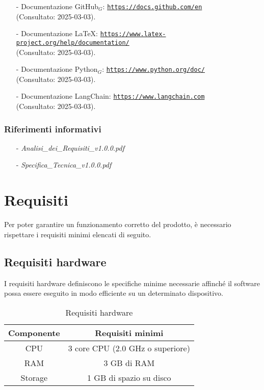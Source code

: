 \documentclass[10pt]{article}
\begin{document}
\begin{justify}
\begin{itemize}
    \item[-] Documentazione GitHub$_G$: \textcolor{blue}{\texttt{\url{https://docs.github.com/en}}} \\
    (Consultato: 2025-03-03).
    
    \item[-] Documentazione \LaTeX: \textcolor{blue}{\texttt{\url{https://www.latex-project.org/help/documentation/}}} \\
    (Consultato: 2025-03-03).
    
    \item[-] Documentazione Python$_G$: \textcolor{blue}{\texttt{\url{https://www.python.org/doc/}}} \\
    (Consultato: 2025-03-03).
    
    \item[-] Documentazione LangChain: \textcolor{blue}{\texttt{\url{https://www.langchain.com}}} \\
    (Consultato: 2025-03-03).
\end{itemize}

\subsubsection{Riferimenti informativi}
\begin{itemize}
    \item[-] \textit{Analisi\_dei\_Requisiti\_v1.0.0.pdf}
    \item[-] \textit{Specifica\_Tecnica\_v1.0.0.pdf}
\end{itemize}

\newpage

\section{Requisiti}
\label{sec:requisiti}
Per poter garantire un funzionamento corretto del prodotto, è necessario rispettare i requisiti minimi elencati di seguito.

\subsection{Requisiti hardware}
I requisiti hardware definiscono le specifiche minime necessarie affinché il software possa essere eseguito in modo efficiente su un determinato dispositivo.

\begin{table}[H]
    \centering
    \begin{tabular}{|c|c|}
        \hline
        \rowcolor{gray!25}
        Componente & Requisiti minimi \\
        \hline
        CPU & 3 core CPU (2.0 GHz o superiore)\\
        \hline
        RAM & 3 GB di RAM\\
        \hline
        Storage & 1 GB di spazio su disco\\
        \hline
    \end{tabular}
    \caption{Requisiti hardware}
    \label{tab:requisiti_hardware}
\end{table}


\end{justify}
\end{document}
